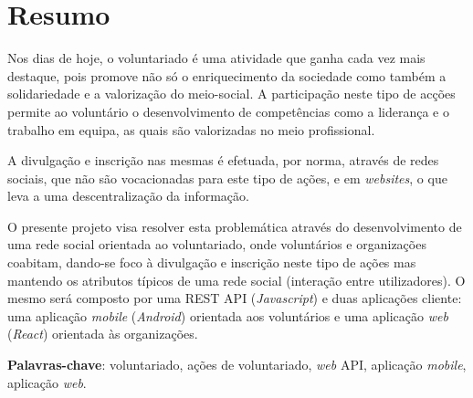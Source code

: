 \section*{Resumo}
Nos dias de hoje, o voluntariado é uma atividade que ganha cada vez mais destaque, pois promove não só o enriquecimento da sociedade como também a solidariedade e a valorização do meio-social. A participação neste tipo de acções permite ao voluntário o desenvolvimento de competências como a liderança e o trabalho em equipa, as quais são valorizadas no meio profissional. \par \smallskip
A divulgação e inscrição nas mesmas é efetuada, por norma, através de redes sociais, que não são vocacionadas para este tipo de ações, e em \textit{websites}, o que leva a uma descentralização da informação. \par \smallskip
O presente projeto visa resolver esta problemática através do desenvolvimento de uma rede social orientada ao voluntariado, onde voluntários e organizações coabitam, dando-se foco à divulgação e inscrição neste tipo de ações mas mantendo os atributos típicos de uma rede social (interação entre utilizadores). O mesmo será composto por uma REST API (\textit{Javascript}) e duas aplicações cliente: uma aplicação \textit{mobile} (\textit{Android}) orientada aos voluntários e uma aplicação \textit{web} (\textit{React}) orientada às organizações. \par \smallskip
\textbf{Palavras-chave}: voluntariado, ações de voluntariado, \textit{web} API, aplicação \textit{mobile}, aplicação \textit{web}.